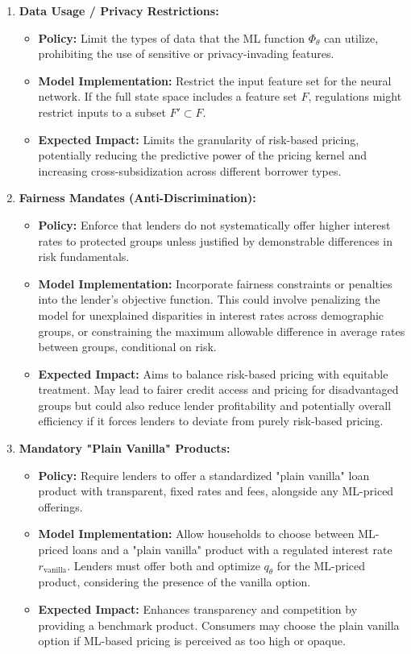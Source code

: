 \documentclass[acmsmall]{acmart}
\begin{document}
\begin{enumerate}
    \item \textbf{Data Usage / Privacy Restrictions:}
    \begin{itemize}
        \item \textbf{Policy:} Limit the types of data that the ML function $\Phi_\theta$ can utilize, prohibiting the use of sensitive or privacy-invading features.
        \item \textbf{Model Implementation:} Restrict the input feature set for the neural network. If the full state space includes a feature set $F$, regulations might restrict inputs to a subset $F' \subset F$.
        \item \textbf{Expected Impact:} Limits the granularity of risk-based pricing, potentially reducing the predictive power of the pricing kernel and increasing cross-subsidization across different borrower types.
    \end{itemize}

    \item \textbf{Fairness Mandates (Anti-Discrimination):}
    \begin{itemize}
        \item \textbf{Policy:} Enforce that lenders do not systematically offer higher interest rates to protected groups unless justified by demonstrable differences in risk fundamentals.
        \item \textbf{Model Implementation:} Incorporate fairness constraints or penalties into the lender’s objective function. This could involve penalizing the model for unexplained disparities in interest rates across demographic groups, or constraining the maximum allowable difference in average rates between groups, conditional on risk.
        \item \textbf{Expected Impact:} Aims to balance risk-based pricing with equitable treatment. May lead to fairer credit access and pricing for disadvantaged groups but could also reduce lender profitability and potentially overall efficiency if it forces lenders to deviate from purely risk-based pricing.
    \end{itemize}

    \item \textbf{Mandatory "Plain Vanilla" Products:}
    \begin{itemize}
        \item \textbf{Policy:} Require lenders to offer a standardized "plain vanilla" loan product with transparent, fixed rates and fees, alongside any ML-priced offerings.
        \item \textbf{Model Implementation:} Allow households to choose between ML-priced loans and a "plain vanilla" product with a regulated interest rate $r_{\text{vanilla}}$. Lenders must offer both and optimize $q_\theta$ for the ML-priced product, considering the presence of the vanilla option.
        \item \textbf{Expected Impact:} Enhances transparency and competition by providing a benchmark product. Consumers may choose the plain vanilla option if ML-based pricing is perceived as too high or opaque.
    \end{itemize}


\end{enumerate}
\end{document}
